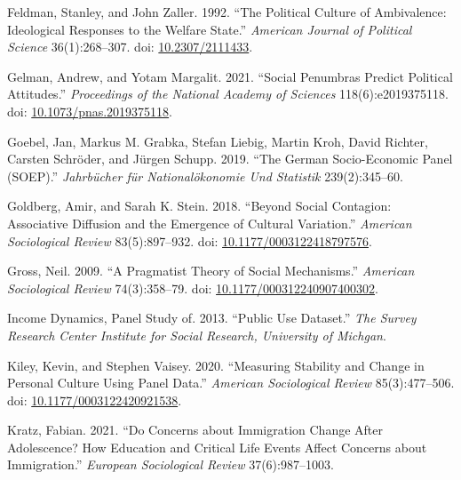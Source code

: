 \documentclass[
  12pt,
]{article}
\newlength{\cslhangindent}
\newlength{\cslentryspacingunit} %
\newenvironment{CSLReferences}[2] %
 {%
  \setlength{\parindent}{0pt}
  \ifodd #1
  \let\oldpar\par
  \def\par{\hangindent=\cslhangindent\oldpar}
  \fi
  \setlength{\parskip}{#2\cslentryspacingunit}
 }%
 {}
\begin{document}
\begin{CSLReferences}{1}{0}
\leavevmode{}%
Feldman, Stanley, and John Zaller. 1992. {``The {Political} {Culture} of
{Ambivalence}: {Ideological} {Responses} to the {Welfare} {State}.''}
\emph{American Journal of Political Science} 36(1):268--307. doi:
\href{https://doi.org/10.2307/2111433}{10.2307/2111433}.

\leavevmode{}%
Gelman, Andrew, and Yotam Margalit. 2021. {``Social Penumbras Predict
Political Attitudes.''} \emph{Proceedings of the National Academy of
Sciences} 118(6):e2019375118. doi:
\href{https://doi.org/10.1073/pnas.2019375118}{10.1073/pnas.2019375118}.

\leavevmode{}%
Goebel, Jan, Markus M. Grabka, Stefan Liebig, Martin Kroh, David
Richter, Carsten Schröder, and Jürgen Schupp. 2019. {``The German
Socio-Economic Panel (SOEP).''} \emph{Jahrb{ü}cher f{ü}r
National{ö}konomie Und Statistik} 239(2):345--60.

\leavevmode{}%
Goldberg, Amir, and Sarah K. Stein. 2018. {``Beyond {Social}
{Contagion}: {Associative} {Diffusion} and the {Emergence} of {Cultural}
{Variation}.''} \emph{American Sociological Review} 83(5):897--932. doi:
\href{https://doi.org/10.1177/0003122418797576}{10.1177/0003122418797576}.

\leavevmode{}%
Gross, Neil. 2009. {``A {Pragmatist} {Theory} of {Social}
{Mechanisms}.''} \emph{American Sociological Review} 74(3):358--79. doi:
\href{https://doi.org/10.1177/000312240907400302}{10.1177/000312240907400302}.

\leavevmode{}%
Income Dynamics, Panel Study of. 2013. {``Public Use Dataset.''}
\emph{The Survey Research Center Institute for Social Research,
University of Michgan}.

\leavevmode{}%
Kiley, Kevin, and Stephen Vaisey. 2020. {``Measuring {Stability} and
{Change} in {Personal} {Culture} {Using} {Panel} {Data}.''}
\emph{American Sociological Review} 85(3):477--506. doi:
\href{https://doi.org/10.1177/0003122420921538}{10.1177/0003122420921538}.

\leavevmode{}%
Kratz, Fabian. 2021. {``Do Concerns about Immigration Change After
Adolescence? How Education and Critical Life Events Affect Concerns
about Immigration.''} \emph{European Sociological Review}
37(6):987--1003.


\end{CSLReferences}
\end{document}
